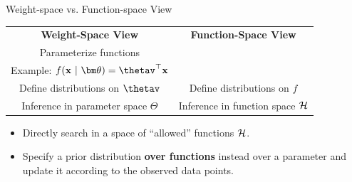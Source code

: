 \documentclass[11pt,compress,t,notes=noshow, xcolor=table]{beamer}
\begin{document}
\begin{frame}{Weight-space vs. Function-space View}

\begin{table}
  \begin{tabular}{cc}
  \textbf{Weight-Space View} & \textbf{Function-Space View} \vspace{1mm}\\ 
  Parameterize functions & \\
  \footnotesize Example: $\fxt = \thetav^\top \xv$ & \vspace{1mm}\\
  Define distributions on $\thetav$ & Define distributions on $f$ \vspace{1mm}\\
  Inference in parameter space $\Theta$ & Inference in function space $\mathcal{H}$
  \end{tabular}
\end{table}  


\begin{itemize}
  \item Directly search in a space of \enquote{allowed} functions $\mathcal{H}$.  
  \item Specify a prior distribution \textbf{over functions} instead over a parameter and update it according to the observed data points. 
\end{itemize}


\begin{center}
    
\end{center}
\end{frame}
\end{document}
